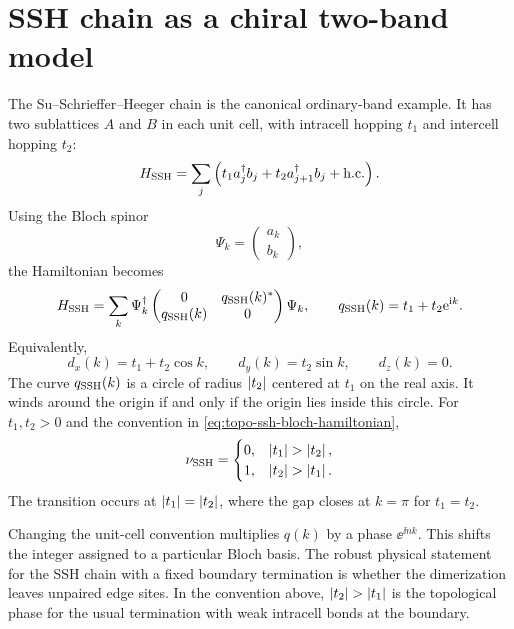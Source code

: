 \section{SSH chain as a chiral two-band model}
\label{sec:topo-ssh-chain}

The Su--Schrieffer--Heeger chain is the canonical ordinary-band example.  It has
two sublattices $A$ and $B$ in each unit cell, with intracell hopping $t_1$ and
intercell hopping $t_2$:
\begin{equation}
\label{eq:topo-ssh-real-space}
    H_{\rm SSH}
    =
    \sum_j
    \left(
        t_1 a_j^\dagger b_j
        +t_2 a_{j+1}^\dagger b_j
        +\text{h.c.}
    \right).
\end{equation}
Using the Bloch spinor
\begin{equation}
    \Psi_k=\begin{pmatrix}a_k\\ b_k\end{pmatrix},
\end{equation}
the Hamiltonian becomes
\begin{equation}
\label{eq:topo-ssh-bloch-hamiltonian}
    H_{\rm SSH}
    =
    \sum_k\Psi_k^\dagger
    \begin{pmatrix}
        0 & q_{\rm SSH}(k)^*\\
        q_{\rm SSH}(k) & 0
    \end{pmatrix}
    \Psi_k,
    \qquad
    q_{\rm SSH}(k)=t_1+t_2\mathrm{e}^{\mathrm{i} k}.
\end{equation}
Equivalently,
\begin{equation}
\label{eq:topo-ssh-d-vector}
    d_x(k)=t_1+t_2\cos k,
    \qquad
    d_y(k)=t_2\sin k,
    \qquad
    d_z(k)=0.
\end{equation}
The curve $q_{\rm SSH}(k)$ is a circle of radius $\left|t_2\right|$ centered at $t_1$ on
the real axis.  It winds around the origin if and only if the origin lies inside
this circle.  For $t_1,t_2>0$ and the convention in
\cref{eq:topo-ssh-bloch-hamiltonian},
\begin{equation}
\label{eq:topo-ssh-winding-result}
    \nu_{\rm SSH}
    =
    \begin{cases}
    0, & \abs{t_1}>\abs{t_2},\\
    1, & \abs{t_2}>\abs{t_1}.
    \end{cases}
\end{equation}
The transition occurs at $\left|t_1\right|=\left|t_2\right|$, where the gap closes at
$k=\pi$ for $t_1=t_2$.

\begin{remark}
Changing the unit-cell convention multiplies $q(k)$ by a phase
$\ee^{\ii n k}$.  This shifts the integer assigned to a particular Bloch
basis.  The robust physical statement for the SSH chain with a fixed boundary
termination is whether the dimerization leaves unpaired edge sites.  In the
convention above, $\abs{t_2}>\abs{t_1}$ is the topological phase for the usual
termination with weak intracell bonds at the boundary.
\end{remark}

